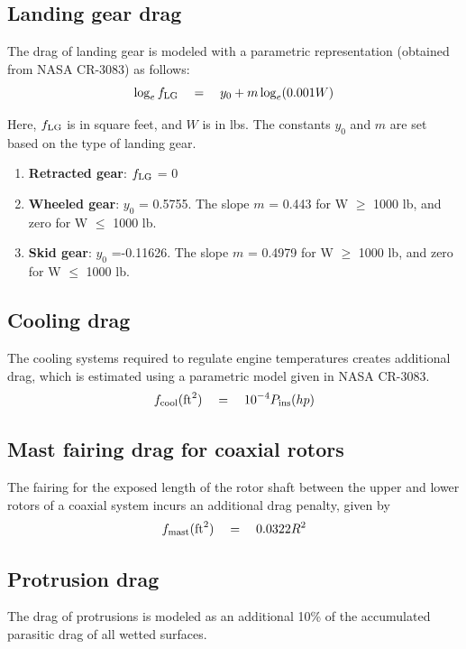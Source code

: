 \subsection{Landing gear drag}
The drag of landing gear is modeled with a parametric representation (obtained from NASA CR-3083) as follows:
\begin{equation}
\log_e f_{\rm LG} \quad = \quad y_0 + m \log_e(0.001 W)
\end{equation}

Here, $f_{\rm LG}$ is in square feet, and $W$ is in lbs. The constants $y_0$ and $m$ are set based on the type of landing gear. 
\begin{enumerate}
\item \textbf{Retracted gear}: $f_{\rm LG}$ = 0
\item \textbf{Wheeled gear}: $y_0$ = 0.5755. The slope $m$ = 0.443  for W $\geq$ 1000 lb, and zero for W $\leq$ 1000 lb.
\item \textbf{Skid gear}:  $y_0$ =-0.11626. The slope $m$ = 0.4979  for W $\geq$ 1000 lb, and zero for W $\leq$ 1000 lb.
\end{enumerate}

\subsection{Cooling drag}
The cooling systems required to regulate engine temperatures creates additional drag, which is estimated using a parametric model given in NASA CR-3083.
\begin{equation}
f_{\rm cool} ({\rm ft}^2)\quad = \quad 10^{-4} P_{\rm ins} (hp)
\end{equation}

\subsection{Mast fairing drag for coaxial rotors}
The fairing for the exposed length of the rotor shaft between the upper and lower rotors of a coaxial system incurs an additional drag penalty, given by 
\begin{equation}
f_{\rm mast} ({\rm ft}^2)\quad = \quad 0.0322 R^2
\end{equation}

\subsection{Protrusion drag}
The drag of protrusions is modeled as an additional 10\% of the accumulated parasitic drag of all wetted surfaces.

